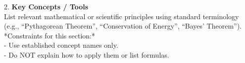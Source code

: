 \begin{table}[p]
\begin{tcolorbox}
2. \textbf{Key Concepts / Tools}\\

List relevant mathematical or scientific principles using standard terminology (e.g., ``Pythagorean Theorem'', ``Conservation of Energy'', ``Bayes' Theorem'').\\

*Constraints for this section:*\\[1em]
- Use established concept names only.\\
- Do NOT explain how to apply them or list formulas.
\end{tcolorbox}
\caption{The prompt instructs the model to produce a concise, high-level outline of the reasoning process, while omitting detailed computations and final answers.}
\label{tab:skeleton_system_prompt}
\end{table}
